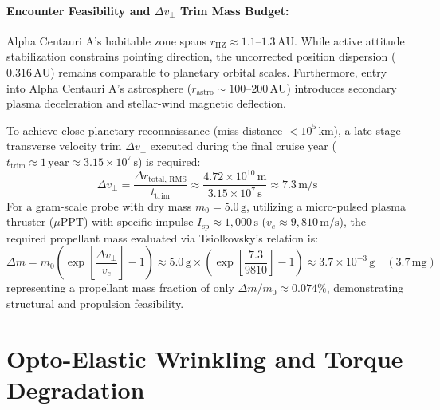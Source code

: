 \documentclass[11pt, a4paper]{article}
\begin{document}
\paragraph{Encounter Feasibility and $\Delta v_{\perp}$ Trim Mass Budget:}
Alpha Centauri A's habitable zone spans $r_{\text{HZ}} \approx 1.1$--$1.3\,\text{AU}$. While active attitude stabilization constrains pointing direction, the uncorrected position dispersion ($0.316\,\text{AU}$) remains comparable to planetary orbital scales. Furthermore, entry into Alpha Centauri A's astrosphere ($r_{\text{astro}} \sim 100\text{--}200\,\text{AU}$) introduces secondary plasma deceleration and stellar-wind magnetic deflection. 

To achieve close planetary reconnaissance (miss distance $< 10^5\,\text{km}$), a late-stage transverse velocity trim $\Delta v_{\perp}$ executed during the final cruise year ($t_{\text{trim}} \approx 1\,\text{year} \approx 3.15 \times 10^7\,\text{s}$) is required:
\begin{equation}
    \Delta v_{\perp} = \frac{\Delta r_{\text{total, RMS}}}{t_{\text{trim}}} \approx \frac{4.72 \times 10^{10}\,\text{m}}{3.15 \times 10^7\,\text{s}} \approx 7.3\,\text{m/s}
\end{equation}
For a gram-scale probe with dry mass $m_0 = 5.0\,\text{g}$, utilizing a micro-pulsed plasma thruster ($\mu\text{PPT}$) with specific impulse $I_{\text{sp}} \approx 1,000\,\text{s}$ ($v_e \approx 9,810\,\text{m/s}$), the required propellant mass evaluated via Tsiolkovsky's relation is:
\begin{equation}
    \Delta m = m_0 \left( \exp\left[\frac{\Delta v_{\perp}}{v_e}\right] - 1 \right) \approx 5.0\,\text{g} \times \left( \exp\left[\frac{7.3}{9810}\right] - 1 \right) \approx 3.7 \times 10^{-3}\,\text{g} \quad (3.7\,\text{mg})
\end{equation}
representing a propellant mass fraction of only $\Delta m / m_0 \approx 0.074\%$, demonstrating structural and propulsion feasibility.

\section{Opto-Elastic Wrinkling and Torque Degradation}
\end{document}
